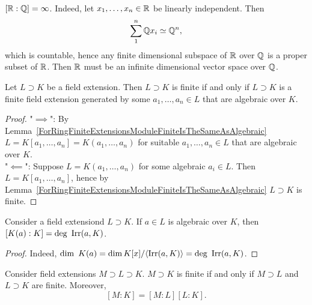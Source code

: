    \begin{example}
        $[\mathbb{R} : \mathbb{Q}] = \infty$. Indeed, let $x_1,\dots,x_n\in \mathbb{R}$ be linearly independent. Then 
        $$
            \sum_1^n \mathbb{Q} x_i \simeq \mathbb{Q}^n,
        $$
        which is countable, hence any finite dimensional subspace of $\mathbb{R}$ over $\mathbb{Q}$ is a proper subset of $\mathbb{R}$. Then $\mathbb{R}$ must be an infinite dimensional vector space over $\mathbb{Q}$. 
   \end{example}
    \begin{lemma}\label{ModuleFiniteFieldExtensions}
        Let $L\supset K$ be a field extension. Then $L\supset K$ is finite if and only if $L\supset K$ is a finite field extension generated by some $a_1,\dots,a_n\in L$ that are algebraic over $K$. 
    \end{lemma}
    \begin{proof}
        "$\implies$": By Lemma~\ref{ForRingFiniteExtensionsModuleFiniteIsTheSameAsAlgebraic} $L = K[a_1,\dots,a_n]=K(a_1,\dots,a_n)$ for suitable $a_1,\dots,a_n\in L$ that are algebraic over $K$.\\
        "$\impliedby$": Suppose $L=K(a_1,\dots,a_n)$ for some algebraic $a_i\in L$. Then $L= K[a_1,\dots,a_n]$, hence by Lemma~\ref{ForRingFiniteExtensionsModuleFiniteIsTheSameAsAlgebraic} $L\supset K$ is finite. 
    \end{proof}
     \begin{lemma}
        Consider a field extensiond $L\supset K$. If $a\in L$ is algebraic over $K$, then $[K(a) : K] = \deg \ \mathrm{Irr}(a, K)$. 
    \end{lemma}
    \begin{proof}
        Indeed, $\dim \ K(a) = \dim  K[x]/\langle \mathrm{Irr}(a,K)\rangle = \deg \ \mathrm{Irr}(a,K)$. 
    \end{proof}
    \begin{lemma}
        Consider field extensions $M\supset L \supset K$. $M\supset K$ is finite if and only if $M\supset L$ and $L\supset K$ are finite. Moreover, 
        $$
            [M : K] = [M : L] [L : K].
        $$ 
    \end{lemma}
